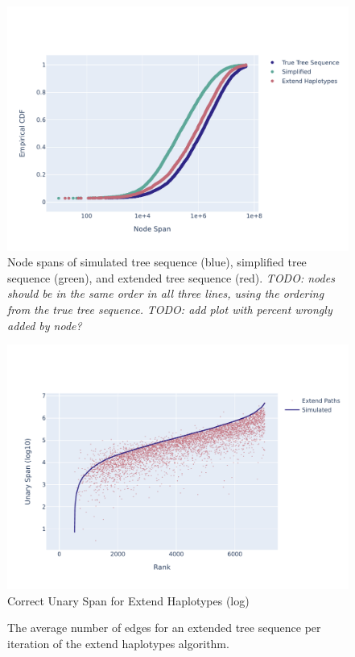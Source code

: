 \documentclass[10pt,twoside,lineno]{gsajnl}
\newcommand{\comment}[1]{{\color{violet} \it #1}}
\begin{document}
\begin{figure}[bht]
	\includegraphics[width=0.9\linewidth]{newplots_wo_ee/node_spans_wo_trapped_unary_regions_CDF.pdf}
	\caption{
        Node spans of simulated tree sequence (blue), simplified tree sequence (green), and extended tree sequence (red).
        \comment{TODO: nodes should be in the same order in all three lines,
        using the ordering from the true tree sequence.}
        \comment{TODO: add plot with percent wrongly added by node?}
    }
	\label{fig:node-spans}
\end{figure}

\begin{figure}[bht]
	\includegraphics[width=0.9\linewidth]{newplots_wo_ee/better_unary_spans_ep_log.pdf}
	\caption{Correct Unary Span for Extend Haplotypes (log)}
	\label{fig:correct-unary-span-log}
\end{figure}

\begin{figure}
	\caption{The average number of edges for an extended tree sequence per iteration of the extend haplotypes algorithm.}
	\label{fig:edges-per-iteration}
\end{figure}
\end{document}
